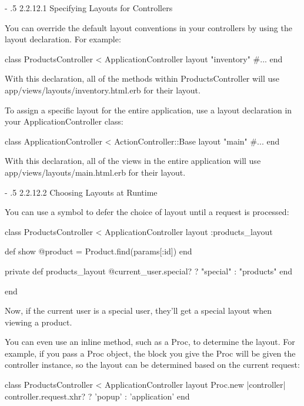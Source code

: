 \documentclass[10pt]{book}
\makeatletter
\renewcommand\paragraph{%
   \@startsection{paragraph}{4}{0mm}%
      {-\baselineskip}%
      {.5\baselineskip}%
      {\normalfont\scriptsize\bfseries}}
\newenvironment{code}{%
  \scriptsize
    \verbatim
}{%
    \endverbatim
    \newline
}
\makeatother
\begin{document}
\paragraph{2.2.12.1 Specifying Layouts for Controllers}

You can override the default layout conventions in your controllers by using the layout declaration. For example:
\begin{code}
class ProductsController < ApplicationController
  layout "inventory"
  #...
end
\end{code}

With this declaration, all of the methods within ProductsController will use app/views/layouts/inventory.html.erb for their layout.

To assign a specific layout for the entire application, use a layout declaration in your ApplicationController class:
\begin{code}
class ApplicationController < ActionController::Base
  layout "main"
  #...
end
\end{code}

With this declaration, all of the views in the entire application will use app/views/layouts/main.html.erb for their layout.

\paragraph{2.2.12.2 Choosing Layouts at Runtime}

You can use a symbol to defer the choice of layout until a request is processed:
\begin{code}
class ProductsController < ApplicationController
  layout :products_layout
 
  def show
    @product = Product.find(params[:id])
  end
 
  private
    def products_layout
      @current_user.special? ? "special" : "products"
    end
 
end
\end{code}

Now, if the current user is a special user, they’ll get a special layout when viewing a product.

You can even use an inline method, such as a Proc, to determine the  layout. For example, if you pass a Proc object, the block you give the  Proc will be given the controller instance, so the layout can be determined based on the current request:
\begin{code}
class ProductsController < ApplicationController
layout Proc.new { 
|controller| controller.request.xhr? ? 'popup' : 'application'
}
end
\end{code}
\end{document}
